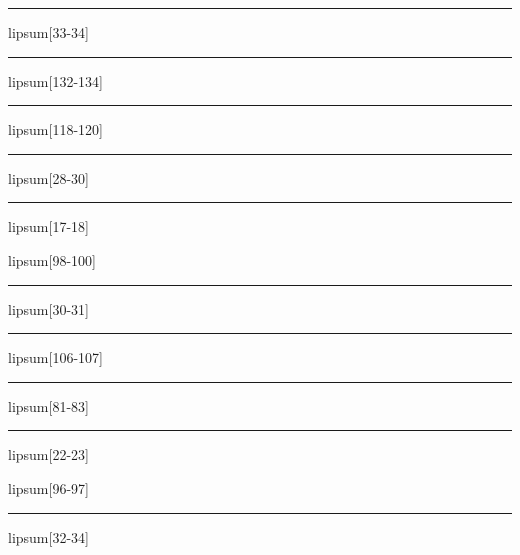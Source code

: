 \documentclass[11pt,a4paper]{article}
\begin{document}
\begin{simplewrap}
  \textcolor{magenta!47}{\rule{4.0cm}{3.4cm}}
\end{simplewrap}
lipsum[33-34]

\begin{simplewrap}
  \textcolor{cyan!17}{\rule{5.2cm}{5.8cm}}
\end{simplewrap}
lipsum[132-134]

\begin{simplewrap}
  \textcolor{blue!42}{\rule{3.7cm}{6.9cm}}
\end{simplewrap}
lipsum[118-120]

\begin{simplewrap}
  \textcolor{red!13}{\rule{6.0cm}{8.8cm}}
\end{simplewrap}
lipsum[28-30]

\begin{simplewrap}
  \textcolor{blue!14}{\rule{5.7cm}{4.6cm}}
\end{simplewrap}
lipsum[17-18]

lipsum[98-100]

\begin{simplewrap}
  \textcolor{cyan!28}{\rule{4.4cm}{6.8cm}}
\end{simplewrap}
lipsum[30-31]

\begin{simplewrap}
  \textcolor{magenta!56}{\rule{5.6cm}{5.4cm}}
\end{simplewrap}
lipsum[106-107]

\begin{simplewrap}
  \textcolor{blue!35}{\rule{4.2cm}{2.8cm}}
\end{simplewrap}
lipsum[81-83]

\begin{simplewrap}
  \textcolor{lime!19}{\rule{5.1cm}{5.8cm}}
\end{simplewrap}
lipsum[22-23]

lipsum[96-97]

\begin{simplewrap}
  \textcolor{purple!45}{\rule{3.2cm}{9.7cm}}
\end{simplewrap}
lipsum[32-34]
\end{document}
